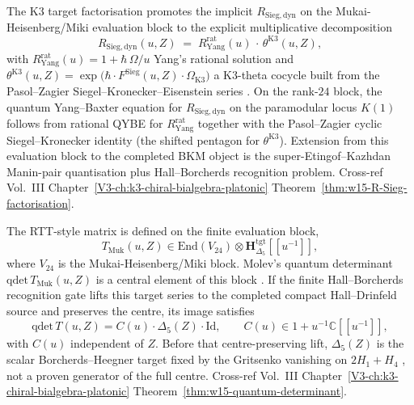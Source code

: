 \begin{remark}
\label{rem:specbraid-3-supplement}
The K3 target factorisation promotes the implicit $R_{\mathrm{Sieg,dyn}}$
on the Mukai-Heisenberg/Miki evaluation block to the explicit
multiplicative decomposition
\[
 R_{\mathrm{Sieg,dyn}}(u,Z) \;=\;
 R^{\mathrm{rat}}_{\mathrm{Yang}}(u)\,\cdot\,\theta^{\mathrm{K3}}(u,Z),
\]
with $R^{\mathrm{rat}}_{\mathrm{Yang}}(u) = 1 + \hbar\,\Omega/u$
Yang's rational solution \cite{Yang1967} and
$\theta^{\mathrm{K3}}(u,Z) = \exp\bigl(\hbar\cdot
F^{\mathrm{Sieg}}(u,Z)\cdot\Omega_{\mathrm{K3}}\bigr)$ a K3-theta
cocycle built from the Pasol--Zagier Siegel--Kronecker--Eisenstein
series \cite{PasolZagier2013,EtingofSchiffmann1998}. On the
rank-$24$ block, the quantum Yang--Baxter equation for
$R_{\mathrm{Sieg,dyn}}$ on the paramodular locus $K(1)$ follows from
rational QYBE for
$R^{\mathrm{rat}}_{\mathrm{Yang}}$ together with the Pasol--Zagier
cyclic Siegel--Kronecker identity (the shifted pentagon for
$\theta^{\mathrm{K3}}$). Extension from this evaluation block to the
completed BKM object is the super-Etingof--Kazhdan Manin-pair
quantisation plus Hall--Borcherds recognition problem. Cross-ref Vol.~III
Chapter~\ref{V3-ch:k3-chiral-bialgebra-platonic}
Theorem~\ref{thm:w15-R-Sieg-factorisation}.
\end{remark}

\begin{remark}
\label{rem:specbraid-4-supplement}
The RTT-style matrix is defined on the finite evaluation block,
\[
T_{\mathrm{Muk}}(u,Z)\in\mathrm{End}(V_{24})\otimes
\mathbf H_{\Delta_5}^{\mathrm{tgt}}[[u^{-1}]],
\]
where $V_{24}$ is the Mukai-Heisenberg/Miki block. Molev's quantum
determinant $\mathrm{qdet}\,T_{\mathrm{Muk}}(u,Z)$ is a central element
of this block \cite{Molev2007}. If the finite Hall--Borcherds
recognition gate lifts this target series to the completed compact
Hall--Drinfeld source and preserves the centre, its image satisfies
\[
\mathrm{qdet}\,T(u,Z)=C(u)\cdot\Delta_5(Z)\cdot\mathrm{Id},
\qquad
C(u)\in 1+u^{-1}\mathbb C[[u^{-1}]],
\]
with $C(u)$ independent of $Z$. Before that centre-preserving lift,
$\Delta_5(Z)$ is the scalar Borcherds--Heegner target fixed by the
Gritsenko vanishing on $2H_1+H_4$
\cite{Gritsenko1999,GritsenkoNikulin1998}, not a proven generator of
the full centre. Cross-ref Vol.~III
Chapter~\ref{V3-ch:k3-chiral-bialgebra-platonic}
Theorem~\ref{thm:w15-quantum-determinant}.
\end{remark}
